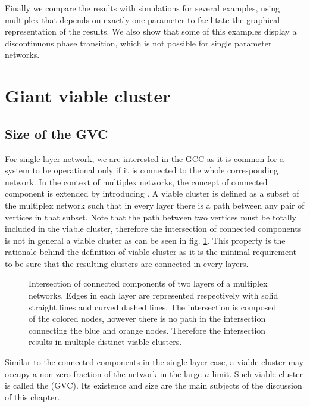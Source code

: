 \documentclass[
11pt, %
american, %
singlespacing, %
final, %
nolistspacing, %
liststotoc, %
headsepline, %
]{MastersDoctoralThesis} %
\begin{document}
Finally we compare the results with simulations for several examples, using multiplex that depends on exactly one parameter to facilitate the graphical representation of the results. We also show that some of this examples display a discontinuous phase transition, which is not possible for single parameter networks.

\section{Giant viable cluster}
\label{Section: Giant Viable Cluster}

\subsection{Size of the GVC}
\label{Section: Size of GVC}

For single layer network, we are interested in the GCC as it is common for a system to be operational only if it is connected to the whole corresponding network. In the context of multiplex networks, the concept of connected component is extended by introducing . A viable cluster is defined as a subset of the multiplex network such that in every layer there is a path between any pair of vertices in that subset. Note that the path between two vertices must be totally included in the viable cluster, therefore the intersection of connected components is not in general a viable cluster as can be seen in fig. \ref{Figure: Intersection of connected is not viable}. This property is the rationale behind the definition of viable cluster as it is the minimal requirement to be sure that the resulting clusters are connected in every layers.

\begin{figure}
	
	\caption{Intersection of connected components of two layers of a multiplex networks. Edges in each layer are represented respectively with solid straight lines and curved dashed lines. The intersection is composed of the colored nodes, however there is no path in the intersection connecting the blue and orange nodes. Therefore the intersection results in multiple distinct viable clusters.}
	\label{Figure: Intersection of connected is not viable}
\end{figure}

Similar to the connected components in the single layer case, a viable cluster may occupy a non zero fraction of the network in the large $n$ limit. Such viable cluster is called the  (GVC). Its existence and size are the main subjects of the discussion of this chapter.
\end{document}

